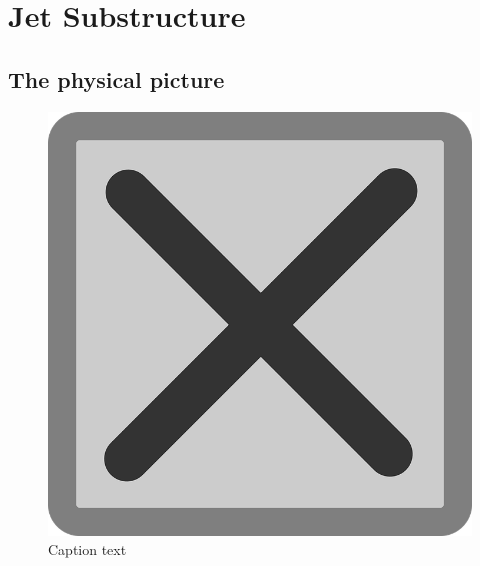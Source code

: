 \chapter{Jet Substructure}

\section{The physical picture}

\begin{figure}[t!]
    \centering
    \includegraphics[width=\textwidth]{figures/tempfig}

    \caption{
        Caption text
    }

    \label{fig:label}
\end{figure}




\section{}


